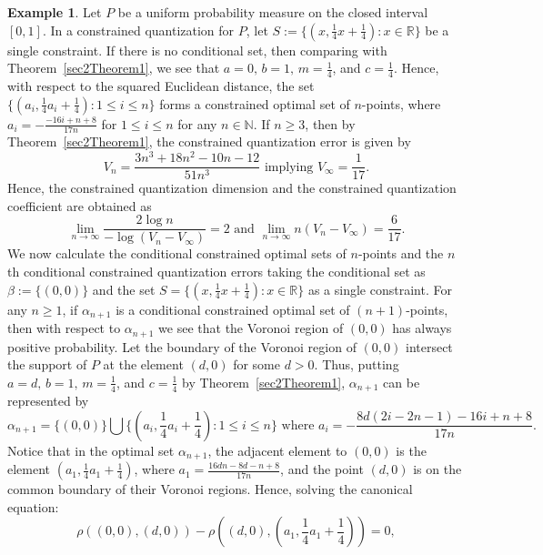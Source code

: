 \documentclass[12pt, reqno]{amsart}
\theoremstyle{plain}
\theoremstyle{definition}
\newtheorem{exam}[subsection]{Example}
\newcommand{\UU}{\bigcup}%
\newcommand{\set}[1]{\{#1\}}%
\newcommand{\ga}{\alpha}
\newcommand{\gb}{\beta}
\newcommand{\D}[1]{\mathbb{#1}}%
\newcommand{\te}{\text}%
\begin{document}
\begin{exam} \label{exam1} 
 Let $P$ be a uniform probability measure on the closed interval $[0, 1]$. In a constrained quantization for $P$, let $S:=\set{(x, \frac 14 x+\frac 1 4) : x\in \D R}$ be a single constraint. If there is no conditional set, then comparing with Theorem~\ref{sec2Theorem1}, we see that 
$a=0, \, b=1, \, m=\frac 1 4$, and $c=\frac 14$. Hence, with respect to the squared Euclidean distance, the set $\{(a_i, \frac 14 a_i+\frac 14): 1\leq i \leq n\}$ forms a constrained optimal set of $n$-points, where $a_i=-\frac{-16 i+n+8}{17 n}$ for $1\leq i\leq n$ for any $n\in \D N$. If $n\geq 3$, then by Theorem~\ref{sec2Theorem1}, the constrained quantization error is given by 
\[V_n=\frac{3 n^3+18 n^2-10 n-12}{51 n^3} \te{ implying } V_\infty=\frac{1}{17}.\]
Hence, the constrained quantization dimension and the constrained quantization coefficient are obtained as 
\begin{equation} \label{Megha12} 
\lim_{n\to \infty}\frac{2\log n}{-\log (V_n-V_\infty)}=2 \te{ and } \lim_{n\to\infty} n(V_n-V_\infty)=\frac{6}{17}.
\end{equation} 
We now calculate the conditional constrained optimal sets of $n$-points and the $n$th conditional constrained quantization errors taking the conditional set as $\gb:=\set{(0, 0)}$ and the set $S=\set{(x, \frac 14 x+\frac 1 4) : x\in \D R}$ as a single constraint. For any $n\geq 1$, if $\ga_{n+1}$ is a conditional constrained optimal set of $(n+1)$-points, then with respect to $\ga_{n+1}$ we see that the Voronoi region of $(0, 0)$ has always positive probability. Let the boundary of the Voronoi region of $(0,0)$ intersect the support of $P$ at the element $(d, 0)$ for some $d>0$. Thus, putting $a=d, \, b=1, \, m=\frac 1 4$, and $c=\frac 14$ by Theorem~\ref{sec2Theorem1},  $\ga_{n+1}$ can be represented by
\[\ga_{n+1}= \{(0, 0)\}\UU \Big\{(a_i, \frac 14 a_i+\frac 14) : 1\leq i\leq n\Big\} \te{ where } a_i=-\frac{8 d (2 i-2 n-1)-16 i+n+8}{17 n}.\]
Notice that in the optimal set $\ga_{n+1}$, the adjacent element to $(0,0)$ is the element $(a_1, \frac 14 a_1+\frac 14)$, where $a_1=\frac{16 d n-8 d-n+8}{17 n}$, and the point $(d,0)$ is on the common boundary of their Voronoi regions. Hence, solving the canonical equation: 
\[\rho((0, 0), (d, 0))-\rho((d, 0), (a_1, \frac 14 a_1+\frac 14))=0,\]

\end{exam}
\end{document}

